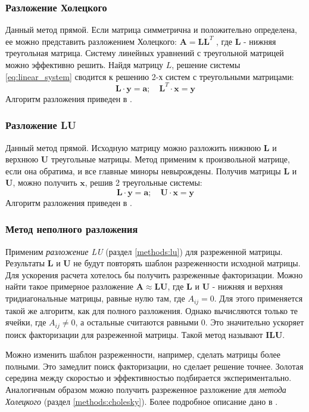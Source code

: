 \subsubsection{Разложение Холецкого \label{methods:cholesky}}
Данный метод прямой. Если матрица симметрична и положительно определена, ее можно представить разложением Холецкого: $\mathbf{A} = \mathbf{LL}^T$ , где $\mathbf{L}$ - нижняя треугольная матрица. Систему линейных уравнений с треугольной матрицей можно эффективно решить. 
Найдя матрицу $L$, решение системы \eqref{eq:linear_system} сводится к решению 2-х систем с треугольными матрицами:
\begin{equation}
    \mathbf{L} \cdot \mathbf{y} = \mathbf{a};
    \quad
    \mathbf{L}^T \cdot \mathbf{x} = \mathbf{y}
\end{equation}
Алгоритм разложения приведен в \cite{Petrov}.

\subsubsection{Разложение LU \label{methods:lu}}
Данный метод прямой. Исходную матрицу можно разложить нижнюю $\mathbf{L}$ и верхнюю $\mathbf{U}$ треугольные матрицы. Метод применим к произвольной матрице, если она обратима, и все главные миноры невырождены. Получив матрицы $\mathbf{L}$ и $\mathbf{U}$, можно получить $\mathbf{x}$, решив 2 треугольные системы:
\begin{equation}
    \mathbf{L} \cdot \mathbf{y} = \mathbf{a};
    \quad
    \mathbf{U} \cdot \mathbf{x} = \mathbf{y}
\end{equation}
Алгоритм разложения приведен в \cite{Petrov}.

\subsubsection{Метод неполного разложения \label{methods:ilu}}
Применим \textit{разложение LU} (раздел \ref{methods:lu}) для разреженной матрицы. Результаты $\mathbf{L}$ и $\mathbf{U}$ не будут повторять шаблон разреженности исходной матрицы. Для ускорения расчета хотелось бы получить разреженные факторизации. Можно найти такое примерное разложение $\mathbf{A} \approx \mathbf{LU}$, где $\mathbf{L}$  и $\mathbf{U}$ - нижняя и верхняя тридиагональные матрицы, равные нулю там, где ${A}_{ij} = 0$. Для этого применяется такой же алгоритм, как для полного разложения. Однако вычисляются только те ячейки, где ${A}_{ij} \neq 0$, а остальные считаются равными $0$.  Это значительно ускоряет поиск факторизации для разреженной матрицы. Такой метод называют \textbf{ILU}.
\par
Можно изменить шаблон разреженности, например, сделать матрицы более полными. Это замедлит поиск факторизации, но сделает решение точнее. Золотая середина между скоростью и эффективностью подбирается экспериментально. Аналогичным образом можно получить разреженное разложение для \textit{метода Холецкого} (раздел \ref{methods:cholesky}). Более подробное описание дано в \cite{Golub}.

